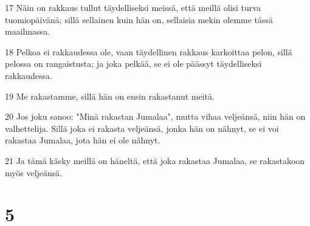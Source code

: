 \par 17 Näin on rakkaus tullut täydelliseksi meissä, että meillä olisi turva tuomiopäivänä; sillä sellainen kuin hän on, sellaisia mekin olemme tässä maailmassa.
\par 18 Pelkoa ei rakkaudessa ole, vaan täydellinen rakkaus karkoittaa pelon, sillä pelossa on rangaistusta; ja joka pelkää, se ei ole päässyt täydelliseksi rakkaudessa.
\par 19 Me rakastamme, sillä hän on ensin rakastanut meitä.
\par 20 Jos joku sanoo: "Minä rakastan Jumalaa", mutta vihaa veljeänsä, niin hän on valhettelija. Sillä joka ei rakasta veljeänsä, jonka hän on nähnyt, se ei voi rakastaa Jumalaa, jota hän ei ole nähnyt.
\par 21 Ja tämä käsky meillä on häneltä, että joka rakastaa Jumalaa, se rakastakoon myös veljeänsä.

\chapter{5}

